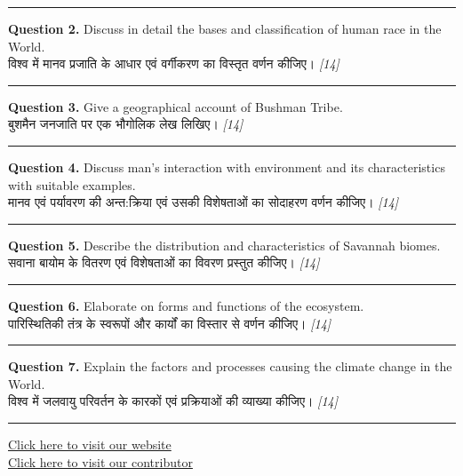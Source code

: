 \documentclass[11pt,a4paper]{article}
\newcommand{\pts}[1]{\hfill \textit{[#1]}}
\begin{document}
\bigskip
\rule{\linewidth}{0.2pt}
\bigskip

\noindent \textbf{Question 2.} Discuss in detail the bases and classification of human race in the World.\\[1pt]
विश्व में मानव प्रजाति के आधार एवं वर्गीकरण का विस्तृत वर्णन कीजिए। \pts{14}

\medskip\rule{\linewidth}{0.2pt}\medskip

\noindent \textbf{Question 3.} Give a geographical account of Bushman Tribe.\\[1pt]
बुशमैन जनजाति पर एक भौगोलिक लेख लिखिए। \pts{14}

\medskip\rule{\linewidth}{0.2pt}\medskip

\noindent \textbf{Question 4.} Discuss man's interaction with environment and its characteristics with suitable examples.\\[1pt]
मानव एवं पर्यावरण की अन्त:क्रिया एवं उसकी विशेषताओं का सोदाहरण वर्णन कीजिए। \pts{14}

\medskip\rule{\linewidth}{0.2pt}\medskip

\noindent \textbf{Question 5.} Describe the distribution and characteristics of Savannah biomes.\\[1pt]
सवाना बायोम के वितरण एवं विशेषताओं का विवरण प्रस्तुत कीजिए। \pts{14}

\medskip\rule{\linewidth}{0.2pt}\medskip

\noindent \textbf{Question 6.} Elaborate on forms and functions of the ecosystem.\\[1pt]
पारिस्थितिकी तंत्र के स्वरूपों और कार्यों का विस्तार से वर्णन कीजिए। \pts{14}

\medskip\rule{\linewidth}{0.2pt}\medskip

\noindent \textbf{Question 7.} Explain the factors and processes causing the climate change in the World.\\[1pt]
विश्व में जलवायु परिवर्तन के कारकों एवं प्रक्रियाओं की व्याख्या कीजिए। \pts{14}

\vfill
\rule{\linewidth}{0.4pt}

\begin{center}\small
\href{https://bhu-exam.vercel.app/}{Click here to visit our website}\\[4pt]
\href{https://me-aryan.vercel.app/}{Click here to visit our contributor}
\end{center}
\end{document}

